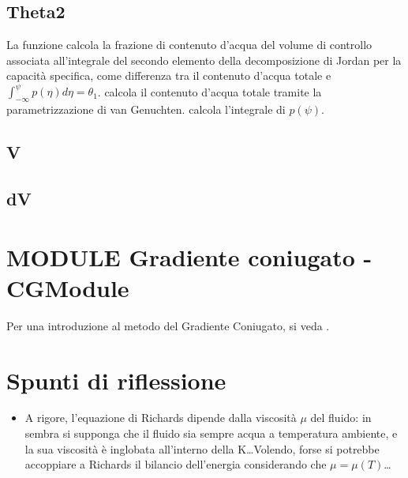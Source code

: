 \documentclass[
10pt, %
a4paper, %
oneside, %
headinclude,footinclude, %
BCOR5mm, %
]{scrartcl}
\begin{document}
	\subsection{Theta2}
		La funzione calcola la frazione di contenuto d'acqua del volume di controllo associata all'integrale 
		del secondo elemento della decomposizione di Jordan per la capacità specifica, come
		differenza tra il contenuto d'acqua totale e $\int_{-\infty}^{\psi}p(\eta)d\eta = \theta_{1}$.
		\subroutines
			calcola il contenuto d'acqua totale tramite la parametrizzazione di van Genuchten.
			calcola l'integrale di $p(\psi)$.

	\subsection{V}

	\subsection{dV}

\section{MODULE Gradiente coniugato - CGModule}
	Per una introduzione al metodo del Gradiente Coniugato, si veda \cite{Shewchuk1994}.

\section{Spunti di riflessione}
\begin{itemize}\itemsep0pt
	\item A rigore, l'equazione di Richards dipende dalla viscosità $\mu$ del fluido: in \cite{Casulli2010} sembra si supponga che il fluido sia sempre acqua a temperatura ambiente, e la sua viscosità è inglobata all'interno della K\dots Volendo, forse si potrebbe accoppiare a Richards il bilancio dell'energia considerando che $\mu=\mu(T)$\dots
\end{itemize}
\end{document}
